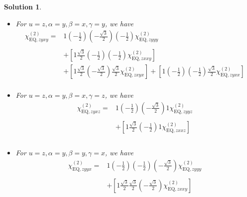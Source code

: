 \documentclass[UTF8,10pt,a4paper]{article}
\theoremstyle{Problem}
\theoremstyle{Solution}
\newtheorem*{sol}{Solution}
\begin{document}
\begin{sol}
\begin{itemize}
\begin{align}
\nonumber&\\
\nonumber&+\left[1\frac{\sqrt{3}}{2}\left(-\frac{1}{2}\right)\left(-\frac{\sqrt{3}}{2}\right)\chi_{\text{EQ},zxxy}^{(2)}\right]\\
\nonumber&+\left[1\frac{\sqrt{3}}{2}\left(-\frac{\sqrt{3}}{2}\right)\left(-\frac{1}{2}\right)\chi_{\text{EQ},zxyx}^{(2)}\right]+\left[1\left(-\frac{1}{2}\right)\left(-\frac{1}{2}\right)\left(-\frac{1}{2}\right)\chi_{\text{EQ},zyxx}^{(2)}\right]\\
&
\end{align}\normalsize
\item For $u=z,\alpha=y,\beta=x,\gamma=y$, we have
\footnotesize\begin{align}
\nonumber\chi_{\text{EQ},zyxy}^{(2)}=&1\left(-\frac{1}{2}\right)\left(-\frac{\sqrt{3}}{2}\right)\left(-\frac{1}{2}\right)\chi_{\text{EQ},zyyy}^{(2)}\\
\nonumber&\\
\nonumber&+\left[1\frac{\sqrt{3}}{2}\left(-\frac{1}{2}\right)\left(-\frac{1}{2}\right)\chi_{\text{EQ},zxxy}^{(2)}\right]\\
\nonumber&+\left[1\frac{\sqrt{3}}{2}\left(-\frac{\sqrt{3}}{2}\right)\frac{\sqrt{3}}{2}\chi_{\text{EQ},zxyx}^{(2)}\right]+\left[1\left(-\frac{1}{2}\right)\left(-\frac{1}{2}\right)\frac{\sqrt{3}}{2}\chi_{\text{EQ},zyxx}^{(2)}\right]\\
&
\end{align}\normalsize
\item For $u=z,\alpha=y,\beta=x,\gamma=z$, we have
\footnotesize\begin{align}
\nonumber\chi_{\text{EQ},zyxz}^{(2)}=&1\left(-\frac{1}{2}\right)\left(-\frac{\sqrt{3}}{2}\right)1\chi_{\text{EQ},zyyz}^{(2)}\\
\nonumber&\\
\nonumber&+\left[1\frac{\sqrt{3}}{2}\left(-\frac{1}{2}\right)1\chi_{\text{EQ},zxxz}^{(2)}\right]\\
\nonumber&\\
&
\end{align}\normalsize
\item For $u=z,\alpha=y,\beta=y,\gamma=x$, we have
\footnotesize\begin{align}
\nonumber\chi_{\text{EQ},zyyx}^{(2)}=&1\left(-\frac{1}{2}\right)\left(-\frac{1}{2}\right)\left(-\frac{\sqrt{3}}{2}\right)\chi_{\text{EQ},zyyy}^{(2)}\\
\nonumber&\\
\nonumber&+\left[1\frac{\sqrt{3}}{2}\frac{\sqrt{3}}{2}\left(-\frac{\sqrt{3}}{2}\right)\chi_{\text{EQ},zxxy}^{(2)}\right]\\

\end{align}
\end{itemize}
\end{sol}
\end{document}
